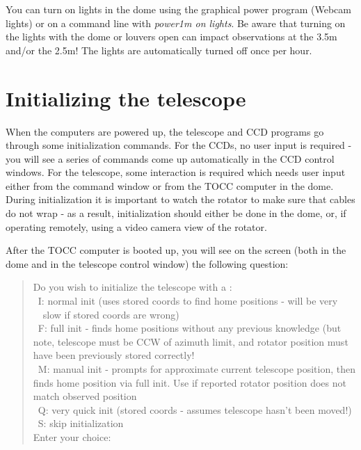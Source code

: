 \documentclass[10pt]{report}
\begin{document}
%
%
You can turn on lights in the dome using the graphical power program (Webcam
lights) or on a command line with \textit{power1m on lights}. Be aware that
turning on the lights with the dome or louvers open can impact observations
at the 3.5m and/or the 2.5m!  The lights are automatically turned off once per 
hour.

\section{Initializing the telescope}

When the computers are powered up, the telescope and CCD programs go
through some initialization commands. For the CCDs, no user input is 
required - you will see a series of commands come up automatically in
the CCD control windows. For the telescope, some interaction is required
which needs user input either from the command window
or from the TOCC computer in the dome. During initialization it is important
to watch the rotator to make sure that cables do not wrap - as a result,
initialization should either be done in the dome, or, if operating remotely,
using a video camera view of the rotator.

After the TOCC computer is booted up, you will see on the screen (both
in the dome and in the telescope control window) the following question:

\begin{quote}
Do you wish to initialize the telescope with a :\\
\ I: normal init (uses stored coords to find home positions - will be very\\
\ \    slow if stored coords are wrong)\\
\ F: full init - finds home positions without any previous knowledge (but note,
telescope must be CCW of azimuth limit, and rotator position must have been
previously stored correctly!\\
\ M: manual init - prompts for approximate current telescope position, then 
finds home position via full init. Use if reported rotator position does
not match observed position\\
\ Q: very quick init (stored coords - assumes telescope hasn't been moved!)\\
\  S: skip initialization\\
Enter your choice: \\
\end{quote}
\end{document}
